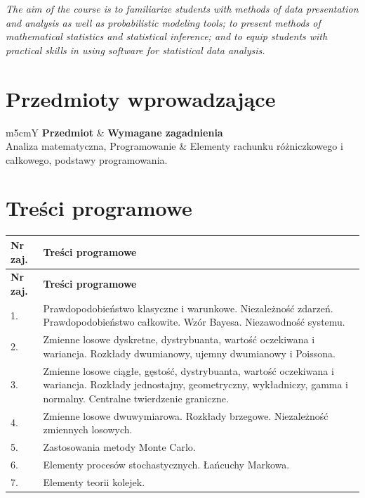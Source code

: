 \documentclass[12pt, a4paper]{article}
\newcommand{\thdrule}{\noalign{\global\setlength{\extrarowheight}{0pt}}}
\newcommand{\thdend}{\noalign{\global\setlength{\extrarowheight}{3pt}}}
\begin{document}
\textit{The aim of the course is to familiarize students with methods of data presentation and analysis as well as probabilistic modeling tools; to present methods of mathematical statistics and statistical inference; and to equip students with practical skills in using software for statistical data analysis.}


\section{Przedmioty wprowadzające}

{\scriptsize
\begin{tabularx}{\textwidth}{m{5cm}Y}
\thdrule\toprule
{} {\color{white}\textbf{Przedmiot}} & {\color{white}\textbf{Wymagane zagadnienia}} \\
\midrule\thdend
   Analiza matematyczna, Programowanie & Elementy rachunku różniczkowego i całkowego, podstawy programowania. \\
\bottomrule
\end{tabularx}}

\section{Treści programowe}

{\scriptsize
\begin{longtable}{m{1.5cm}m{14.5cm}}
\thdrule\toprule
\rowcolor{pjatkRed} {\color{white}\textbf{Nr zaj.}} & {\color{white}\textbf{Treści programowe}} \\
\midrule\thdend
\endfirsthead
\thdrule\toprule
\rowcolor{pjatkRed} {\color{white}\textbf{Nr zaj.}} & {\color{white}\textbf{Treści programowe}} \\
\midrule\thdend
\endhead
  \rowcolor{tableRowLight} 1. & Prawdopodobieństwo klasyczne i warunkowe. Niezależność zdarzeń. Prawdopodobieństwo całkowite. Wzór Bayesa. Niezawodność systemu. \\
  \rowcolor{tableRowAlt} 2. & Zmienne losowe dyskretne, dystrybuanta, wartość oczekiwana i wariancja. Rozkłady dwumianowy, ujemny dwumianowy i Poissona. \\
  \rowcolor{tableRowLight} 3. & Zmienne losowe ciągłe, gęstość, dystrybuanta, wartość oczekiwana i wariancja. Rozkłady jednostajny, geometryczny, wykładniczy, gamma i normalny. Centralne twierdzenie graniczne. \\
  \rowcolor{tableRowAlt} 4. & Zmienne losowe dwuwymiarowa. Rozkłady brzegowe. Niezależność zmiennych losowych. \\
  \rowcolor{tableRowLight} 5. & Zastosowania metody Monte Carlo. \\
  \rowcolor{tableRowAlt} 6. & Elementy procesów stochastycznych. Łańcuchy Markowa. \\
  \rowcolor{tableRowLight} 7. & Elementy teorii kolejek. \\
\bottomrule
\end{longtable}}
\end{document}
